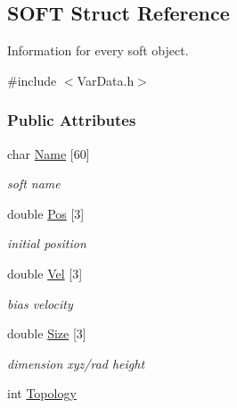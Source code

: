 \hypertarget{structSOFT}{}\subsection{S\+O\+FT Struct Reference}
\label{structSOFT}


Information for every soft object.  




{\ttfamily \#include $<$Var\+Data.\+h$>$}

\subsubsection*{Public Attributes}
\begin{DoxyCompactItemize}
\item 
char \hyperlink{structSOFT_a7b413349ba4d10cbeb9b09be7c471c9e}{Name} \mbox{[}60\mbox{]}\hypertarget{structSOFT_a7b413349ba4d10cbeb9b09be7c471c9e}{}\label{structSOFT_a7b413349ba4d10cbeb9b09be7c471c9e}

\begin{DoxyCompactList}\small\item\em soft name \end{DoxyCompactList}\item 
double \hyperlink{structSOFT_a863738e46f14b3bfc674ad87d35f143d}{Pos} \mbox{[}3\mbox{]}\hypertarget{structSOFT_a863738e46f14b3bfc674ad87d35f143d}{}\label{structSOFT_a863738e46f14b3bfc674ad87d35f143d}

\begin{DoxyCompactList}\small\item\em initial position \end{DoxyCompactList}\item 
double \hyperlink{structSOFT_ae3fae9edc78d8cadc33c5a52bebdb46c}{Vel} \mbox{[}3\mbox{]}\hypertarget{structSOFT_ae3fae9edc78d8cadc33c5a52bebdb46c}{}\label{structSOFT_ae3fae9edc78d8cadc33c5a52bebdb46c}

\begin{DoxyCompactList}\small\item\em bias velocity \end{DoxyCompactList}\item 
double \hyperlink{structSOFT_a6197f6ec9e15464f34e391fbcfdf0de7}{Size} \mbox{[}3\mbox{]}\hypertarget{structSOFT_a6197f6ec9e15464f34e391fbcfdf0de7}{}\label{structSOFT_a6197f6ec9e15464f34e391fbcfdf0de7}

\begin{DoxyCompactList}\small\item\em dimension xyz/rad height \end{DoxyCompactList}\item 
int \hyperlink{structSOFT_a4bbe69a9433b158d68d6b011d0e20ea4}{Topology}\hypertarget{structSOFT_a4bbe69a9433b158d68d6b011d0e20ea4}{}\label{structSOFT_a4bbe69a9433b158d68d6b011d0e20ea4}


\end{DoxyCompactItemize}
